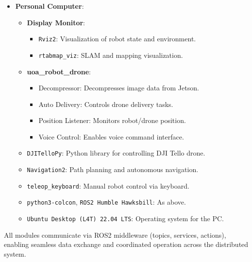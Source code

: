 \begin{itemize}
    \item \textbf{Personal Computer}:
    \begin{itemize}
        \item \textbf{Display Monitor}:
        \begin{itemize}
            \item \texttt{Rviz2}: Visualization of robot state and environment.
            \item \texttt{rtabmap\_viz}: SLAM and mapping visualization.
        \end{itemize}
        \item \textbf{uoa\_robot\_drone}:
        \begin{itemize}
            \item Decompressor: Decompresses image data from Jetson.
            \item Auto Delivery: Controls drone delivery tasks.
            \item Position Listener: Monitors robot/drone position.
            \item Voice Control: Enables voice command interface.
        \end{itemize}
        \item \texttt{DJITelloPy}: Python library for controlling DJI Tello drone.
        \item \texttt{Navigation2}: Path planning and autonomous navigation.
        \item \texttt{teleop\_keyboard}: Manual robot control via keyboard.
        \item \texttt{python3-colcon}, \texttt{ROS2 Humble Hawksbill}: As above.
        \item \texttt{Ubuntu Desktop (L4T) 22.04 LTS}: Operating system for the PC.
    \end{itemize}
\end{itemize}

All modules communicate via ROS2 middleware (topics, services, actions), enabling seamless data exchange and coordinated operation across the distributed system.




